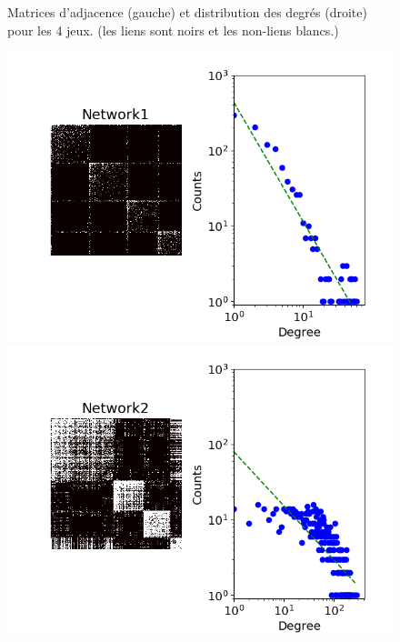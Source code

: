 \documentclass[french]{hermes-journal}
\begin{document}
\begin{figure}[h] {Matrices d'adjacence (gauche) et distribution des degrés (droite) pour les 4 jeux. (les liens sont noirs et les non-liens blancs.)}
        \begin{minipage}{0.35\textwidth}
            \includegraphics[width=1.1\textwidth]{img/corpus/network1_dd}
        \end{minipage}
        \begin{minipage}{0.35\textwidth}
            \includegraphics[width=1.1\textwidth]{img/corpus/network2_dd}
        \end{minipage}
        \begin{minipage}{0.35\textwidth}

\end{minipage}
\end{figure}
\end{document}
